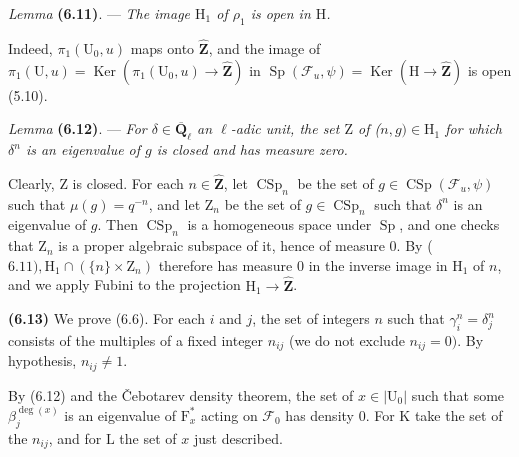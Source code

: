 \documentclass[10pt,leqno]{article}
\begin{document}
\noindent \emph{Lemma} \textbf{(6.11)}. — {\itshape The image \(\mathrm{H}_{1}\) of \(\rho _{1}\) is open in \(\mathrm{H}\).}\par

\noindent Indeed, \(\pi _{1}(\mathrm{U}_{0},u)\) maps onto \(\widehat{\mathbf{Z}}\), and the image of \(\pi _{1}(\mathrm{U},u)=\operatorname{Ker}(\pi _{1}(\mathrm{U}_{0},u)\longrightarrow \widehat{\mathbf{Z}})\) in \(\operatorname{Sp}(\mathcal{F} _{u},\psi )=\operatorname{Ker}(\mathrm{H}\longrightarrow \widehat{\mathbf{Z}})\) is open (5.10).\par

\noindent \emph{Lemma} \textbf{(6.12)}. — {\itshape For \(\delta \in \overline{\mathbf{Q}}_{\ell }\) an \(\ell \)-adic unit, the set \(\mathrm{Z}\) of (\(n,g)\in \mathrm{H}_{1}\) for which \(\delta ^{n}\) is an eigenvalue of \(g\) is closed and has measure zero.}\par

\noindent Clearly, \(\mathrm{Z}\) is closed. For each \(n\in \widehat{\mathbf{Z}}\), let \(\operatorname{CSp}_{n}\) be the set of \(g\in \operatorname{CSp}(\mathcal{F} _{u},\psi )\) such that \(\mu (g)=q^{- n}\), and let \(\mathrm{Z}_{n}\) be the set of \(g\in \operatorname{CSp}_{n}\) such that \(\delta ^{n}\) is an eigenvalue of \(g\). Then \(\operatorname{CSp}_{n}\) is a homogeneous space under \(\operatorname{Sp}\), and one checks that \(\mathrm{Z}_{n}\) is a proper algebraic subspace of it, hence of measure 0. By (\(6.11), \mathrm{H}_{1}\cap (\{n\}\times \mathrm{Z}_{n})\) therefore has measure 0 in the inverse image in \(\mathrm{H}_{1}\) of \(n\), and we apply Fubini to the projection \(\mathrm{H}_{1}\longrightarrow \widehat{\mathbf{Z}}\).\par

\noindent \textbf{(6.13)} We prove (6.6). For each \(i\) and \(j\), the set of integers \(n\) such that \(\gamma _{i}^{n}=\delta _{j}^{n}\) consists of the multiples of a fixed integer \(n_{ij}\) (we do not exclude \(n_{ij}=0)\). By hypothesis, \(n_{ij}\ne 1\).\par

\noindent By (6.12) and the Čebotarev density theorem, the set of \(x\in |\mathrm{U}_{0}|\) such that some \(\beta _{j}^{\operatorname{deg}(x)}\) is an eigenvalue of \(\mathrm{F}_{x}^{*}\) acting on \(\mathcal{F} _{0}\) has density 0. For \(\mathrm{K}\) take the set of the \(n_{ij}\), and for \(\mathrm{L}\) the set of \(x\) just described.\par
\end{document}
